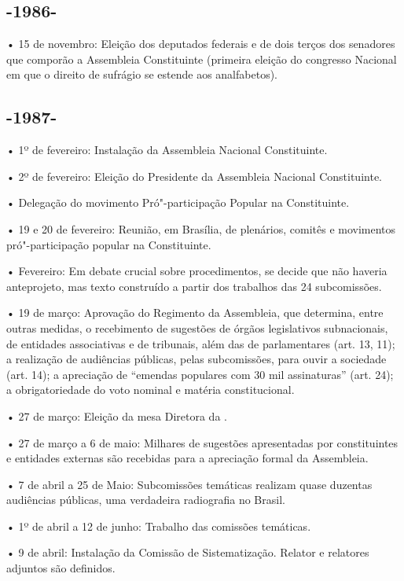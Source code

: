 \subsection{-1986-}

\forceindent{}• 15 de novembro: Eleição dos deputados federais e de dois terços dos
senadores que comporão a Assembleia Constituinte (primeira eleição do
congresso Nacional em que o direito de sufrágio se estende aos
analfabetos).

\subsection{-1987-}

\forceindent{}• 1º de fevereiro: Instalação da Assembleia Nacional Constituinte.

• 2º de fevereiro: Eleição do Presidente da Assembleia Nacional
Constituinte.

• Delegação do movimento Pró"-participação Popular na Constituinte.

• 19 e 20 de fevereiro: Reunião, em Brasília, de plenários, comitês e
movimentos pró"-participação popular na Constituinte.

• Fevereiro: Em debate crucial sobre procedimentos, se decide que não
haveria anteprojeto, mas texto construído a partir dos trabalhos das 24
subcomissões.

• 19 de março: Aprovação do Regimento da Assembleia, que determina,
entre outras medidas, o recebimento de sugestões de órgãos legislativos
subnacionais, de entidades associativas e de tribunais, além das de
parlamentares (art. 13, 11); a realização de audiências públicas, pelas
subcomissões, para ouvir a sociedade (art. 14); a apreciação de
``emendas populares com 30 mil assinaturas'' (art. 24); a obrigatoriedade
do voto nominal e matéria constitucional.

• 27 de março: Eleição da mesa Diretora da .

• 27 de março a 6 de maio: Milhares de sugestões apresentadas por
constituintes e entidades externas são recebidas para a apreciação
formal da Assembleia.

• 7 de abril a 25 de Maio: Subcomissões temáticas realizam quase
duzentas audiências públicas, uma verdadeira radiografia no Brasil.

• 1º de abril a 12 de junho: Trabalho das comissões temáticas.

• 9 de abril: Instalação da Comissão de Sistematização. Relator e
relatores adjuntos são definidos.

